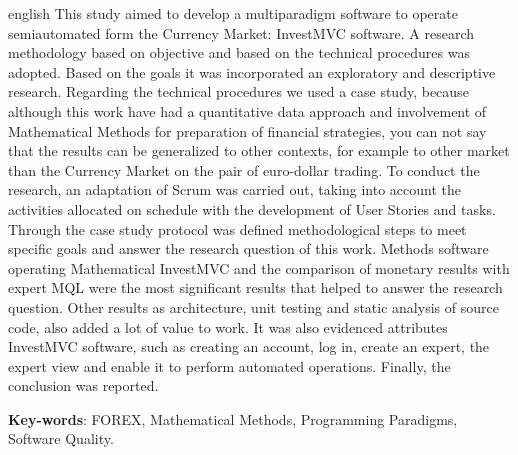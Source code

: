 \begin{resumo}[Abstract]
 \begin{otherlanguage*}{english}
This study aimed to develop a multiparadigm software to operate semiautomated form the Currency Market: InvestMVC software. A research methodology based on objective and based on the technical procedures was adopted. Based on the goals it was incorporated an exploratory and descriptive research. Regarding the technical procedures we used a case study, because although this work have had a quantitative data approach and involvement of Mathematical Methods for preparation of financial strategies, you can not say that the results can be generalized to other contexts, for example to other market than the Currency Market on the pair of euro-dollar trading. To conduct the research, an adaptation of Scrum was carried out, taking into account the activities allocated on schedule with the development of User Stories and tasks. Through the case study protocol was defined methodological steps to meet specific goals and answer the research question of this work. Methods software operating Mathematical InvestMVC and the comparison of monetary results with expert MQL were the most significant results that helped to answer the research question. Other results as architecture, unit testing and static analysis of source code, also added a lot of value to work. It was also evidenced attributes InvestMVC software, such as creating an account, log in, create an expert, the expert view and enable it to perform automated operations. Finally, the conclusion was reported.
   \vspace{\onelineskip}
 
   \noindent
   \textbf{Key-words}: FOREX, Mathematical Methods, Programming Paradigms, Software Quality.
 \end{otherlanguage*}
\end{resumo}

